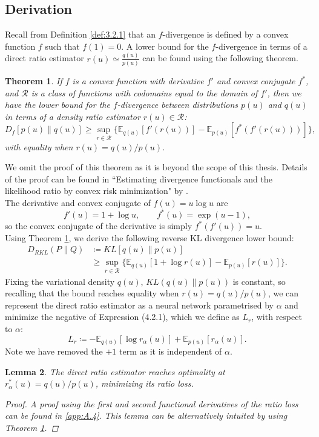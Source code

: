 \documentclass[honours,12pt]{unswthesis}
\newcommand{\E}{\mathbb{E}}
\newtheorem{theorem}{Theorem}[section]
\newtheorem{lemma}[theorem]{Lemma}
\numberwithin{equation}{section}
\theoremstyle{definition}
\begin{document}
\subsection{Derivation}\label{sec:4.2.1}
Recall from Definition \ref{def:3.2.1} that an $f$-divergence is defined by a convex function $f$ such that $f(1)=0$. A lower bound for the $f$-divergence in terms of a direct ratio estimator $r(u)\simeq \frac{q(u)}{p(u)}$ can be found using the following theorem.
\begin{theorem}\label{4.2.1}  \citep{nguyen}
If $f$ is a convex function with derivative $f'$ and convex conjugate $f^*$, and $\mathcal{R}$ is a class of functions with codomains equal to the domain of $f'$, then we have the lower bound for the $f$-divergence between distributions $p(u)$ and $q(u)$ in terms of a density ratio estimator $r(u)\in \mathcal{R}$:
\[D_f [p(u)\|q(u)]\geq \sup_{r\in \mathcal{R}} \{\mathbb{E}_{q(u)}[f'(r(u))]-\mathbb{E}_{p(u)}[f^*(f'(r(u)))]\},\]
with equality when $r(u)=q(u)/p(u)$.
\end{theorem}
We omit the proof of this theorem as it is beyond the scope of this thesis. Details of the proof can be found in ``Estimating divergence functionals and the likelihood ratio by convex risk minimization" by \citet{nguyen}.\\
The derivative and convex conjugate of $f(u)=u\log u$ are
\[f'(u)=1+\log u, \qquad f^*(u)=\exp(u-1),\]
so the convex conjugate of the derivative is simply $f^*(f'(u))=u$.\\
Using Theorem \ref{4.2.1}, we derive the following reverse KL divergence lower bound:
\begin{align}
D_{RKL}(P\|Q)&\coloneqq KL[q(u)\|p(u)]\nonumber\\
&\geq \sup_{r\in \mathcal{R}}\{\mathbb{E}_{q(u)}[1+\log r(u)]-\mathbb{E}_{p(u)}[r(u)]\}.
\end{align}
Fixing the variational density $q(u)$, $KL(q(u)\|p(u))$ is constant, so recalling that the bound reaches equality when $r(u)=q(u)/p(u)$, we can represent the direct ratio estimator as a neural network parametrised by $\alpha$ and minimize the negative of Expression (4.2.1), which we define as $L_r$, with respect to $\alpha$:
\begin{equation}
L_r\coloneqq-\E_{q(u)}[\log r_\alpha(u)]+\E_{p(u)}[r_\alpha(u)].
\end{equation}
Note we have removed the $+1$ term as it is independent of $\alpha$.
\begin{lemma}
The direct ratio estimator reaches optimality at $r^*_\alpha(u)=q(u)/p(u)$, minimizing its ratio loss.
\begin{proof}
A proof using the first and second functional derivatives of the ratio loss can be found in \autoref{app:A.4}. This lemma can be alternatively intuited by using Theorem \ref{4.2.1}.
\end{proof}
\end{lemma}
\end{document}
